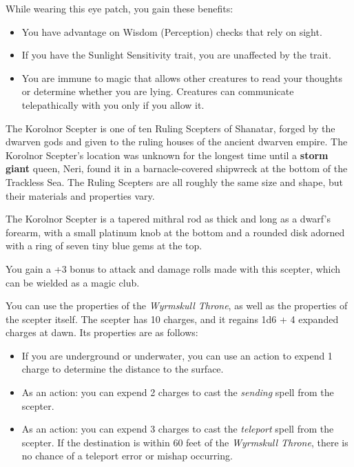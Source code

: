 \documentclass[10pt,a4paper,twoside,bg=print,twocolumn,openany,nodeprecatedcode]{dndbook}
\begin{document}
While wearing this eye patch, you gain these benefits:


\begin{itemize}
\item You have advantage on Wisdom (Perception) checks that rely on sight.
\item If you have the Sunlight Sensitivity trait, you are unaffected by the trait.
\item You are immune to magic that allows other creatures to read your thoughts or determine whether you are lying. Creatures can communicate telepathically with you only if you allow it.
\end{itemize}

The Korolnor Scepter is one of ten Ruling Scepters of Shanatar, forged by the dwarven gods and given to the ruling houses of the ancient dwarven empire. The Korolnor Scepter's location was unknown for the longest time until a \textbf{storm giant} queen, Neri, found it in a barnacle-covered shipwreck at the bottom of the Trackless Sea. The Ruling Scepters are all roughly the same size and shape, but their materials and properties vary.

The Korolnor Scepter is a tapered mithral rod as thick and long as a dwarf's forearm, with a small platinum knob at the bottom and a rounded disk adorned with a ring of seven tiny blue gems at the top.

You gain a +3 bonus to attack and damage rolls made with this scepter, which can be wielded as a magic club.

You can use the properties of the \textit{Wyrmskull Throne}, as well as the properties of the scepter itself. The scepter has 10 charges, and it regains 1d6 + 4 expanded charges at dawn. Its properties are as follows:


\begin{itemize}
\item If you are underground or underwater, you can use an action to expend 1 charge to determine the distance to the surface.
\item As an action: you can expend 2 charges to cast the \textit{sending} spell from the scepter.
\item As an action: you can expend 3 charges to cast the \textit{teleport} spell from the scepter. If the destination is within 60 feet of the \textit{Wyrmskull Throne}, there is no chance of a teleport error or mishap occurring.
\end{itemize}
\end{document}
